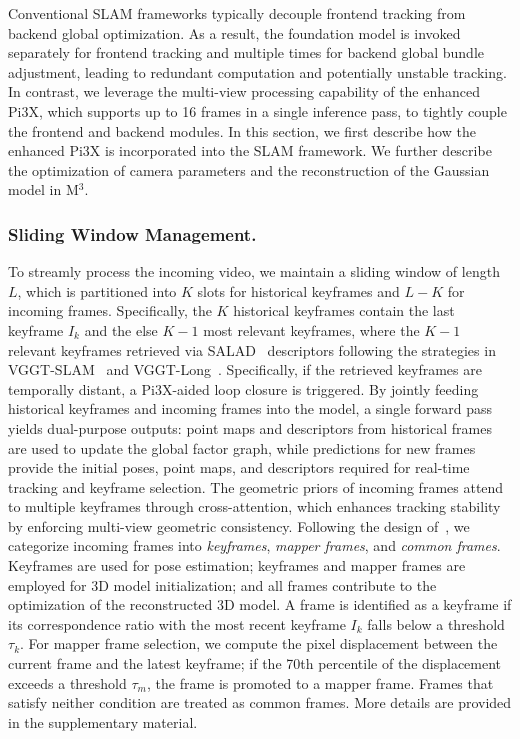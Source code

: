 {%
Conventional SLAM frameworks typically decouple frontend tracking from backend global optimization. As a result, the foundation model is invoked separately for frontend tracking and multiple times for backend global bundle adjustment, leading to redundant computation and potentially unstable tracking. In contrast, we leverage the multi-view processing capability of the enhanced Pi3X, which supports up to 16 frames in a single inference pass, to tightly couple the frontend and backend modules. In this section, we first describe how the enhanced Pi3X is incorporated into the SLAM framework. We further describe the optimization of camera parameters and the reconstruction of the Gaussian model in M$^3$.

\subsubsection{Sliding Window Management.} To streamly process the incoming video, we maintain a sliding window of length $L$, which is partitioned into $K$ slots for historical keyframes and $L-K$ for incoming frames. Specifically, the $K$ historical keyframes contain the last keyframe $I_k$ and the else $K-1$ most relevant keyframes,  where the $K-1$ relevant keyframes retrieved via SALAD~\cite{izquierdo2024optimal} descriptors following the strategies in VGGT-SLAM~\cite{maggio2025vggt} and VGGT-Long~\cite{deng2025vggt}. Specifically, if the retrieved keyframes are temporally distant, a Pi3X-aided loop closure is triggered. By jointly feeding historical keyframes and incoming frames into the model, a single forward pass yields dual-purpose outputs: point maps and descriptors from historical frames are used to update the global factor graph, while predictions for new frames provide the initial poses, point maps, and descriptors required for real-time tracking and keyframe selection. The geometric priors of incoming frames attend to multiple keyframes through cross-attention, which enhances tracking stability by enforcing multi-view geometric consistency. Following the design of~\cite{artdeco}, we categorize incoming frames into \emph{keyframes}, \emph{mapper frames}, and \emph{common frames}. 
Keyframes are used for pose estimation; keyframes and mapper frames are employed for 3D model initialization; and all frames contribute to the optimization of the reconstructed 3D model. A frame is identified as a keyframe if its correspondence ratio with the most recent keyframe $I_k$ falls below a threshold $\tau_k$. 
For mapper frame selection, we compute the pixel displacement between the current frame and the latest keyframe; if the 70th percentile of the displacement exceeds a threshold $\tau_m$, the frame is promoted to a mapper frame. Frames that satisfy neither condition are treated as common frames. More details are provided in the supplementary material.}

